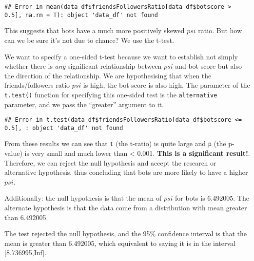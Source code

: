 \documentclass[]{article}
\newenvironment{Shaded}{\begin{snugshade}}{\end{snugshade}}
\newcommand{\DataTypeTok}[1]{\textcolor[rgb]{0.13,0.29,0.53}{#1}}
\newcommand{\FloatTok}[1]{\textcolor[rgb]{0.00,0.00,0.81}{#1}}
\newcommand{\KeywordTok}[1]{\textcolor[rgb]{0.13,0.29,0.53}{\textbf{#1}}}
\newcommand{\NormalTok}[1]{#1}
\newcommand{\OperatorTok}[1]{\textcolor[rgb]{0.81,0.36,0.00}{\textbf{#1}}}
\newcommand{\StringTok}[1]{\textcolor[rgb]{0.31,0.60,0.02}{#1}}
\begin{document}
\begin{verbatim}
## Error in mean(data_df$friendsFollowersRatio[data_df$botscore > 0.5], na.rm = T): object 'data_df' not found
\end{verbatim}

This suggests that bots have a much more positively skewed \(psi\)
ratio. But how can we be sure it's not due to chance? We use the t-test.

We want to specify a one-sided t-test because we want to establish not
simply whether there is \emph{any} significant relationship between
\(psi\) and bot score but also the direction of the relationship. We are
hypothesising that when the friends/followers ratio \(psi\) is high, the
bot score is also high. The parameter of the \texttt{t.test()} function
for specifying this one-sided test is the \texttt{alternative}
parameter, and we pass the ``greater'' argument to it.

\begin{Shaded}
\end{Shaded}

\begin{verbatim}
## Error in t.test(data_df$friendsFollowersRatio[data_df$botscore <= 0.5], : object 'data_df' not found
\end{verbatim}

From these results we can see that \texttt{t} (the t-ratio) is quite
large and \texttt{p} (the p-value) is very small and much lower than
\textless{} 0.001. \textbf{This is a significant result!}. Therefore, we
can reject the null hypothesis and accept the research or alternative
hypothesis, thus concluding that bots are more likely to have a higher
\(psi\).

Additionally: the null hypothesis is that the mean of \(psi\) for bots
is 6.492005. The alternate hypothesis is that the data come from a
distribution with mean greater than 6.492005.

The test rejected the null hypothesis, and the 95\% confidence interval
is that the mean is greater than 6.492005, which equivalent to saying it
is in the interval {[}8.736995,Inf{]}.
\end{document}
